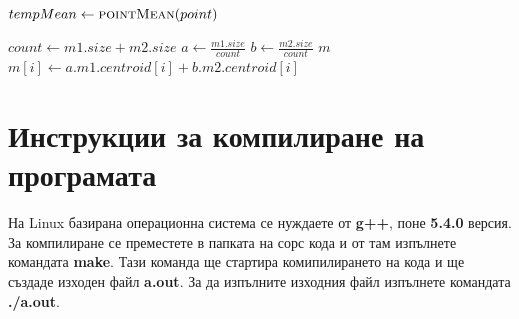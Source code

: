 \documentclass[a4paper, 12pt]{article}
\begin{document}
\begin{algorithm}[H]
\begin{algorithmic}[1]
\State \Return \(<point, 1>\)
\EndFunction
\end{algorithmic}
\end{algorithm}
\begin{algorithm}[H]
\begin{algorithmic}[1]
\State \(tempMean \gets \Call{pointMean}{point}\)
\State \Return {}
\EndFunction
\end{algorithmic}
\end{algorithm}
\begin{algorithm}[H]
\begin{algorithmic}[1]
\State \(count \gets m1.size + m2.size\)
\State \(a \gets \displaystyle\frac{m1.size}{count}\)
\State \(b \gets \displaystyle\frac{m2.size}{count}\)
\State \(m\)
\State \(m[i] \gets a . m1.centroid[i] + b . m2.centroid[i]\)
\EndFor
\State \Return \(<m, count>\)
\EndFunction
\end{algorithmic}
\end{algorithm}
\section{Инструкции за компилиране на програмата}
На Linux базирана операционна система се нуждаете от \textbf{g++}, поне \textbf{5.4.0} версия.
За компилиране се преместете в папката на сорс кода и от там изпълнете командата \textbf{make}.
Тази команда ще стартира комипилирането на кода и ще създаде изходен файл \textbf{a.out}.
За да изпълните изходния файл изпълнете командата \textbf{./a.out}.
\end{document}

